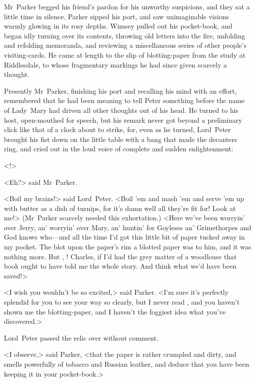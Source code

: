 Mr~Parker begged his friend's pardon for his unworthy suspicions, and they sat a little time in silence. Parker sipped his port, and saw unimaginable visions warmly glowing in its rosy depths. Wimsey pulled out his pocket-book, and began idly turning over its contents, throwing old letters into the fire, unfolding and refolding memoranda, and reviewing a miscellaneous series of other people's visiting-cards. He came at length to the slip of blotting-paper from the study at Riddlesdale, to whose fragmentary markings he had since given scarcely a thought.

Presently Mr~Parker, finishing his port and recalling his mind with an effort, remembered that he had been meaning to tell Peter something before the name of Lady~Mary had driven all other thoughts out of his head. He turned to his host, open-mouthed for speech, but his remark never got beyond a preliminary click like that of a clock about to strike, for, even as he turned, Lord~Peter brought his fist down on the little table with a bang that made the decanters ring, and cried out in the loud voice of complete and sudden enlightenment:

<!>

<Eh?> said Mr~Parker.

<Boil my brains!> said Lord~Peter. <Boil 'em and mash 'em and serve 'em up with butter as a dish of turnips, for it's damn well all they're fit for! Look at me!> (Mr~Parker scarcely needed this exhortation.) <Here we've been worryin' over Jerry, an' worryin' over Mary, an' huntin' for Goyleses an' Grimethorpes and God knows who—and all the time I'd got this little bit of paper tucked away in my pocket. The blot upon the paper's rim a blotted paper was to him, and it was nothing more. But , ! Charles, if I'd had the grey matter of a woodlouse that book ought to have told me the whole story. And think what we'd have been saved!>

<I wish you wouldn't be so excited,> said Parker. <I'm sure it's perfectly splendid for you to see your way so clearly, but I never read , and you haven't shown me the blotting-paper, and I haven't the foggiest idea what you've discovered.>

Lord~Peter passed the relic over without comment.

<I observe,> said Parker, <that the paper is rather crumpled and dirty, and smells powerfully of tobacco and Russian leather, and deduce that you have been keeping it in your pocket-book.>

